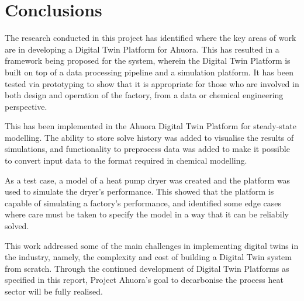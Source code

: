\chapter{Conclusions}






The research conducted in this project has identified where the key areas of work are in developing a Digital Twin Platform for Ahuora. 
This has resulted in a framework being proposed for the system, wherein the Digital Twin Platform is built on top of a data processing pipeline and a simulation platform. 
It has been tested via prototyping to show that it is appropriate for those who are involved in both design and operation of the factory, from a data or chemical engineering perspective.


This has been implemented in the Ahuora Digital Twin Platform for steady-state modelling. 
The ability to store solve history was added to visualise the results of simulations, and functionality to preprocess data was added to make it possible to convert input data to the format required in chemical modelling. 

As a test case, a model of a heat pump dryer was created and the platform was used to simulate the dryer's performance. 
This showed that the platform is capable of simulating a factory's performance, and identified some edge cases where care must be taken to specify the model in a way that it can be reliabily solved.

This work addressed some of the main challenges in implementing digital twins in the industry, namely, the complexity and cost of building a Digital Twin system from scratch. Through the continued development of Digital Twin Platforms as specified in this report, Project Ahuora's goal to decarbonise the process heat sector will be fully realised.


